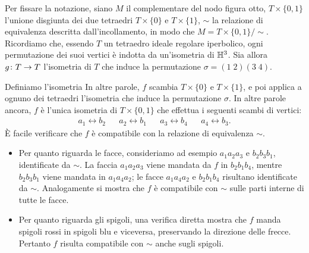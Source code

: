 Per fissare la notazione, siano $M$ il complementare del nodo figura otto, $T\times\{0,1\}$ l'unione disgiunta dei due tetraedri $T\times\{0\}$ e $T\times\{1\}$, $\sim$ la relazione di equivalenza descritta dall'incollamento, in modo che $M=T\times\{0,1\}/\sim$. Ricordiamo che, essendo $T$ un tetraedro ideale regolare iperbolico, ogni permutazione dei suoi vertici è indotta da un'isometria di $\mathbb{H}^3$. Sia allora $\map{g}{T}{T}$ l'isometria di $T$ che induce la permutazione $\sigma=(1\;2)(3\;4)$.
\begin{center}
\end{center}
Definiamo l'isometria
In altre parole, $f$ scambia $T\times\{0\}$ e $T\times\{1\}$, e poi applica a ognuno dei tetraedri l'isometria che induce la permutazione $\sigma$. In altre parole ancora, $f$ è l'unica isometria di $T\times\{0,1\}$ che effettua i seguenti scambi di vertici:
\begin{align*}
a_1\leftrightarrow b_2&&a_2\leftrightarrow b_1&&a_3\leftrightarrow b_4&&a_4\leftrightarrow b_3.
\end{align*}
È facile verificare che $f$ è compatibile con la relazione di equivalenza $\sim$.
\begin{itemize}
\item Per quanto riguarda le facce, consideriamo ad esempio $a_1a_2a_3$ e $b_2b_3b_1$, identificate da $\sim$. La faccia $a_1a_2a_3$ viene mandata da $f$ in $b_2b_1b_4$, mentre $b_2b_3b_1$ viene mandata in $a_1a_4a_2$; le facce $a_1a_4a_2$ e $b_2b_1b_4$ risultano identificate da $\sim$. Analogamente si mostra che $f$ è compatibile con $\sim$ sulle parti interne di tutte le facce.
\item Per quanto riguarda gli spigoli, una verifica diretta mostra che $f$ manda spigoli rossi in spigoli blu e viceversa, preservando la direzione delle frecce. Pertanto $f$ risulta compatibile con $\sim$ anche sugli spigoli.
\end{itemize}

